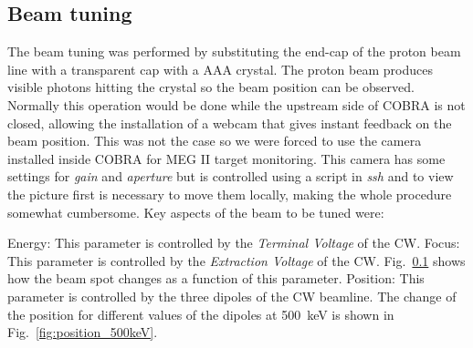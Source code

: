 \begin{refsection}
    \subsection{Beam tuning}
        The beam tuning was performed by substituting the end-cap of the proton beam line with a transparent cap with a AAA crystal. 
        The proton beam produces visible photons hitting the crystal so the beam position can be observed.
        Normally this operation would be done while the upstream side of COBRA is not closed, allowing the installation of a webcam that gives instant feedback on the beam position.
        This was not the case so we were forced to use the camera installed inside COBRA for MEG II target monitoring.
        This camera has some settings for \textit{gain} and \textit{aperture} but is controlled using a script in \textit{ssh} and to view the picture first is necessary to move them locally, making the whole procedure somewhat cumbersome.
        Key aspects of the beam to be tuned were: 
        \begin{outline}
            \1 Energy: This parameter is controlled by the \textit{Terminal Voltage} of the CW.
            \1 Focus: This parameter is controlled by the \textit{Extraction Voltage} of the CW. Fig.~\ref{} shows how the beam spot changes as a function of this parameter. 
            \1 Position: This parameter is controlled by the three dipoles of the CW beamline. The change of the position for different values of the dipoles at \SI{500}{keV} is shown in Fig.~\ref{fig:position_500keV}.
        \end{outline}


\end{refsection}

